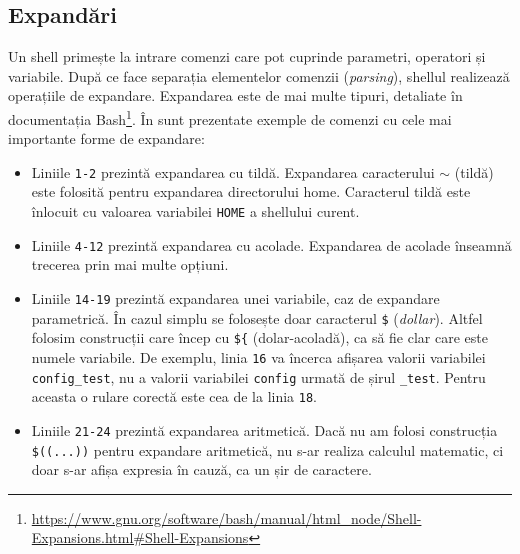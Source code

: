 
\subsection{Expandări}
\label{sec:cli:shell-func:expansion}

Un shell primește la intrare comenzi care pot cuprinde parametri, operatori și variabile.
După ce face separația elementelor comenzii (\textit{parsing}), shellul realizează operațiile de expandare.
Expandarea este de mai
multe tipuri, detaliate în documentația Bash\footnote{\url{https://www.gnu.org/software/bash/manual/html\_node/Shell-Expansions.html\#Shell-Expansions}}.
În  sunt prezentate exemple de comenzi cu cele mai
importante forme de expandare:

\begin{itemize}
  \item Liniile \texttt{1-2} prezintă expandarea cu tildă.
    Expandarea caracterului \texttt{$\sim$} (tildă) este folosită pentru expandarea directorului home.
    Caracterul tildă este înlocuit cu valoarea variabilei \texttt{HOME} a shellului curent.
  \item Liniile \texttt{4-12} prezintă expandarea cu acolade.
    Expandarea de acolade înseamnă trecerea prin mai multe opțiuni.
  \item Liniile \texttt{14-19} prezintă expandarea unei variabile, caz de expandare parametrică.
    În cazul simplu se folosește doar caracterul \texttt{\$} (\textit{dollar}).
    Altfel folosim construcții care încep cu \texttt{\$\{} (dolar-acoladă), ca să fie clar care este numele variabile.
    De exemplu, linia \texttt{16} va încerca afișarea valorii variabilei \texttt{config\_test}, nu a valorii variabilei \texttt{config} urmată de șirul \texttt{\_test}.
    Pentru aceasta o rulare corectă este cea de la linia \texttt{18}.
  \item Liniile \texttt{21-24} prezintă expandarea aritmetică.
    Dacă nu am folosi construcția \verb|$((...))| pentru expandare aritmetică, nu s-ar realiza calculul matematic, ci doar s-ar afișa expresia în cauză, ca un șir de caractere.
\end{itemize}

